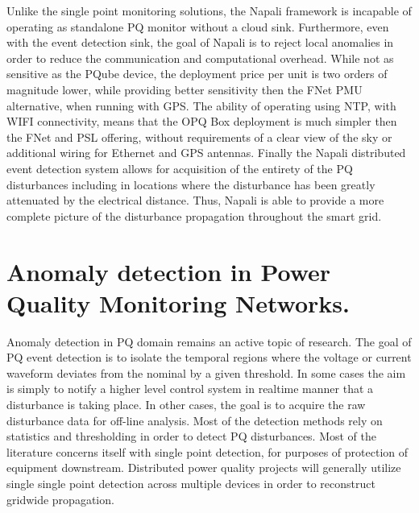 Unlike the single point monitoring solutions, the Napali framework is incapable of operating as standalone PQ monitor without a cloud sink.
Furthermore, even with the event detection sink, the goal of Napali is to reject local anomalies in order to reduce the communication and computational overhead.
While not as sensitive as the PQube device, the deployment price per unit is two orders of magnitude lower, while providing better sensitivity then the FNet PMU alternative, when running with GPS. The ability of operating using NTP, with WIFI connectivity, means that the OPQ Box deployment is much simpler then the FNet and PSL offering, without requirements of a clear view of the sky or additional wiring for Ethernet and GPS antennas.
Finally the Napali distributed event detection system allows for acquisition of the entirety of the PQ disturbances including in locations where the disturbance has been greatly attenuated by the electrical distance.
Thus, Napali is able to provide a more complete picture of the disturbance propagation throughout the smart grid.

\section{Anomaly detection in Power Quality Monitoring Networks.}

Anomaly detection in PQ domain remains an active topic of research.
The goal of PQ event detection is to isolate the temporal regions where the voltage or current waveform deviates from the nominal by a given threshold.
In some cases the aim is simply to notify a higher level control system in realtime manner that a disturbance is taking place.
In other cases, the goal is to acquire the raw disturbance data for off-line analysis.
Most of the detection methods rely on statistics and thresholding in order to detect PQ disturbances.
Most of the literature concerns itself with single point detection, for purposes of protection of equipment downstream.\cite{gu2004statistical}\cite{karimi2000wavelet} \cite{shin2006power} Distributed power quality projects will generally utilize single single point detection across multiple devices in order to reconstruct gridwide propagation.\cite{von2014micro}

